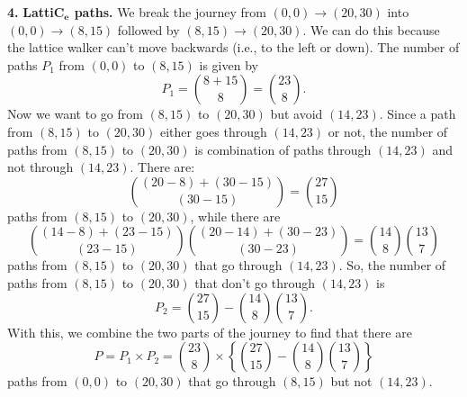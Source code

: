 \documentclass[11pt]{article}
\begin{document}
\noindent \textbf{4.} \textbf{Latti$\mathbf{C_e}$ paths.} We break the journey from $(0,0) \to (20,30)$ into $(0,0) \to (8,15)$ followed by $(8,15)\to (20,30)$. We can do this because the lattice walker can't move backwards (i.e., to the left or down). The number of paths $P_1$ from $(0,0)$ to $(8,15)$ is given by
\begin{equation*}
P_1 = {{8+15}\choose 8} = {23\choose 8}.
\end{equation*}
Now we want to go from $(8,15)$ to $(20,30)$ but avoid $(14,23)$. Since a path from $(8,15)$ to $(20,30)$ either goes through $(14,23)$ or not, the number of paths from $(8,15)$ to $(20,30)$ is combination of paths through $(14,23)$ and not through $(14,23)$. There are:
\begin{equation*}
{ {(20 - 8) + (30-15)} \choose  {(30-15)} } = { {27} \choose  15 }
\end{equation*} 
paths from $(8,15)$ to $(20,30)$, while there are 
\begin{equation*}
{ {(14 - 8) + (23-15)} \choose  {(23-15)} }{ {(20 - 14) + (30-23)} \choose  {(30-23)} } = {14 \choose 8 }{ {13} \choose  7 }
\end{equation*}
paths from $(8,15)$ to $(20,30)$ that go through $(14,23)$. So, the number of paths from $(8,15)$ to $(20,30)$ that don't go through $(14,23)$ is 
\begin{equation*}
P_2 = { {27} \choose  15 } - {14 \choose 8 }{ {13} \choose  7 }.
\end{equation*}
With this, we combine the two parts of the journey to find that there are 
\begin{equation*}
P = P_1 \times P_2= \boxed{{23\choose 8} \times \left\{   { {27} \choose  15 } - {14 \choose 8 }{ {13} \choose  7 }\right\} }
\end{equation*}
paths from $(0,0)$ to $(20,30)$ that go through $(8,15)$ but not $(14,23)$. 




\newpage
\end{document}
